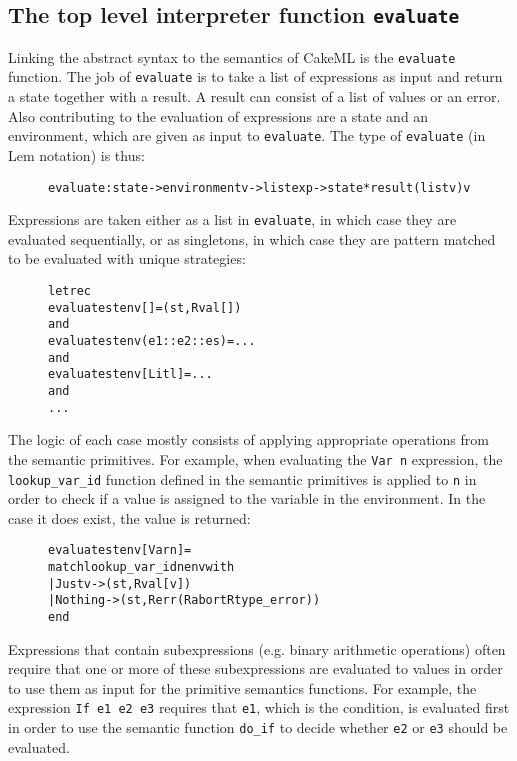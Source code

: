 \subsection{The top level interpreter function \texttt{evaluate}}
Linking the abstract syntax to the semantics of CakeML is the
\texttt{evaluate} function. The job of \texttt{evaluate} is to take a list of
expressions as input and return a state together with a result. A result can
consist of a list of values or an error. Also contributing to the evaluation
of expressions are a state and an environment, which are given as input to
\texttt{evaluate}. The type of \texttt{evaluate} (in Lem notation) is thus:

\begin{figure}[H]
\begin{alltt}
  evaluate:state -> environment v -> list exp -> state*result (list v) v
\end{alltt}
\end{figure}

\noindent Expressions are taken either as a list in \texttt{evaluate},
in which case they are evaluated sequentially, or as singletons, in which case
they are pattern matched to be evaluated with unique strategies:

\begin{figure}[H]
\begin{alltt}
  let rec
  evaluate st env []           = (st, Rval [])
  and
  evaluate st env (e1::e2::es) = ...
  and
  evaluate st env [Lit l]      = ...
  and
  ...
\end{alltt}
\end{figure}

\noindent The logic of each case mostly consists of applying appropriate
operations from the semantic primitives. For example, when evaluating
the \texttt{Var n} expression, the \texttt{lookup\_var\_id} function defined
in the semantic primitives is applied to \texttt{n} in order to check if
a value is assigned to the variable in the environment. In the case it does
exist, the value is returned:

\begin{figure}[H]
\begin{alltt}
  evaluate st env [Var n] =
    match lookup_var_id n env with
    | Just v -> (st, Rval [v])
    | Nothing -> (st, Rerr (Rabort Rtype_error))
    end
\end{alltt}
\end{figure}

\noindent Expressions that contain subexpressions (e.g. binary arithmetic
operations) often require that one or more of these subexpressions are
evaluated to values in order to use them as input for the primitive semantics
functions. For example, the expression \texttt{If e1 e2 e3} requires that
\texttt{e1}, which is the condition, is evaluated first in order to use the
semantic function \texttt{do\_if} to decide whether \texttt{e2} or
\texttt{e3} should be evaluated.


